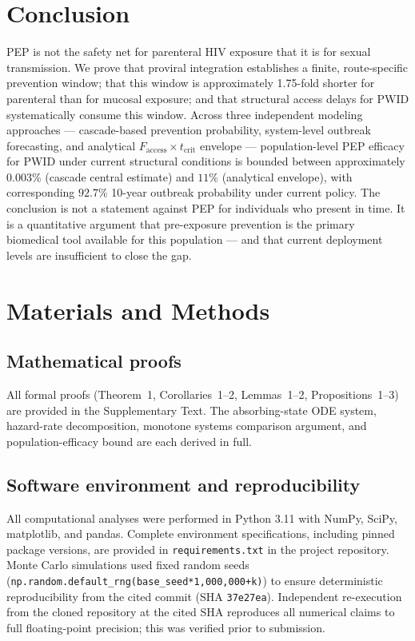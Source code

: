 \documentclass[10pt,letterpaper]{article}
\theoremstyle{definition}
\theoremstyle{remark}
\newcommand{\Faccess}{F_{\text{access}}}
\newcommand{\tcrit}{t_{\text{crit}}}
\begin{document}
\section*{Conclusion}

PEP is not the safety net for parenteral HIV exposure that it is for sexual transmission. We prove that proviral integration establishes a finite, route-specific prevention window; that this window is approximately 1.75-fold shorter for parenteral than for mucosal exposure; and that structural access delays for PWID systematically consume this window. Across three independent modeling approaches --- cascade-based prevention probability, system-level outbreak forecasting, and analytical $\Faccess \times \tcrit$ envelope --- population-level PEP efficacy for PWID under current structural conditions is bounded between approximately $0.003\%$ (cascade central estimate) and $11\%$ (analytical envelope), with corresponding $92.7\%$ 10-year outbreak probability under current policy. The conclusion is not a statement against PEP for individuals who present in time. It is a quantitative argument that pre-exposure prevention is the primary biomedical tool available for this population --- and that current deployment levels are insufficient to close the gap.

\section*{Materials and Methods}

\subsection*{Mathematical proofs}
All formal proofs (Theorem~1, Corollaries~1--2, Lemmas~1--2, Propositions~1--3) are provided in the Supplementary Text. The absorbing-state ODE system, hazard-rate decomposition, monotone systems comparison argument, and population-efficacy bound are each derived in full.

\subsection*{Software environment and reproducibility}
All computational analyses were performed in Python 3.11 with NumPy, SciPy, matplotlib, and pandas. Complete environment specifications, including pinned package versions, are provided in \texttt{requirements.txt} in the project repository. Monte Carlo simulations used fixed random seeds (\texttt{np.random.default\_rng(base\_seed*1{,}000{,}000+k)}) to ensure deterministic reproducibility from the cited commit (SHA \texttt{37e27ea}). Independent re-execution from the cloned repository at the cited SHA reproduces all numerical claims to full floating-point precision; this was verified prior to submission.
\end{document}
